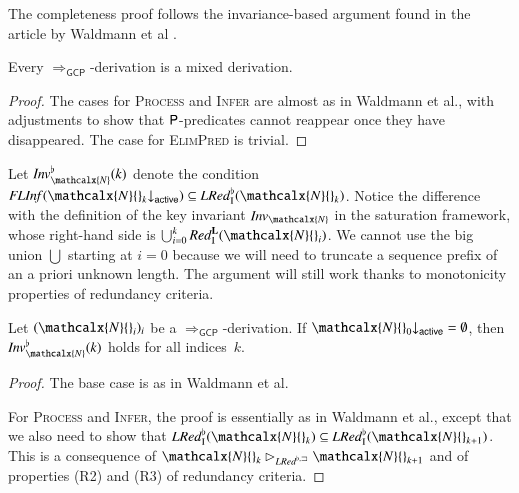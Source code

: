 \begin{rep}
\begin{sloppypar}
   The completeness proof follows the invariance-based argument found in the
   article by Waldmann et al \cite{waldmann-et-al-202x-article}.
\end{sloppypar}

\begin{lemma}
\label{lem:gcp-derivations-are-red-black-derivations}
Every $\Longrightarrow_\mathsf{GCP}$-derivation is a mixed derivation.
\end{lemma}

\begin{proof}
The cases for \textsc{Process} and \textsc{Infer} are almost as in Waldmann et
al., with adjustments to show that $\mathsf{P}$-predicates cannot reappear once
they have disappeared. The case for \textsc{ElimPred} is trivial.
\end{proof}

Let $\Inv\Wksup_\mathcalx{N}(k)$ denote the condition
$\textstyle\FLInf(\mathcalx{N}{}_k{\downarrow}_\mathsf{active}) \subseteq
\LRedIWk(\mathcalx{N}{}_k)$.
Notice the difference with the definition of the key invariant
$\Inv_\mathcalx{N}$ in the saturation framework, whose right-hand side is
$\bigcup_{i=0}^k \RedI^{\Lab}(\mathcalx{N}{}_i)$. We cannot use the
big union ${\bigcup}$ starting at $i = 0$ because we will need to truncate a
sequence prefix of an a priori unknown length. The argument will still work
thanks to monotonicity properties of redundancy criteria.

\begin{lemma}
\label{lem:gcp-invar-gcp}
Let $(\mathcalx{N}{}_i)_i$ be a $\Longrightarrow_\mathsf{GCP}$-derivation.
If
$\mathcalx{N}{}_0{\downarrow}_\mathsf{active} = \emptyset$,
then
$\Inv\Wksup_\mathcalx{N}(k)$ holds for all indices~$k$.
\end{lemma}

\begin{proof}
The base case is as in Waldmann et al.

For \textsc{Process} and \textsc{Infer}, the proof is essentially as in Waldmann
et al., except that we also need to show that
$\LRedIWk(\mathcalx{N}{}_k) \subseteq \LRedIWk(\mathcalx{N}{}_{k+1})$.
This is a consequence of
$\mathcalx{N}{}_k \rhd_{\LRedWksub} \mathcalx{N}{}_{k+1}$ and of
properties (R2) and (R3) of redundancy criteria.

\begin{sloppypar}
   

\end{sloppypar}
\end{proof}
\end{rep}
